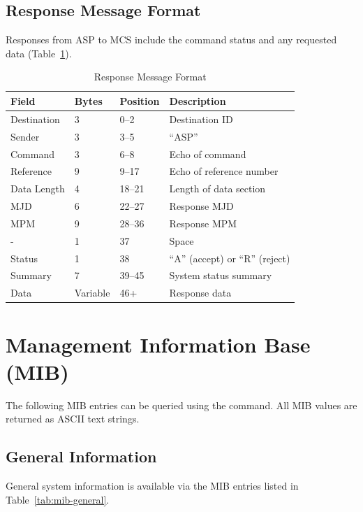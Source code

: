 \subsection{Response Message Format}

Responses from ASP to MCS include the command status and any requested data (Table~\ref{tab:resp-format}).

\begin{table}[htbp]
    \centering
    \caption{Response Message Format}
    \label{tab:resp-format}
    \begin{tabular}{llll}
        \toprule
        \textbf{Field} & \textbf{Bytes} & \textbf{Position} & \textbf{Description} \\
        \midrule
        Destination & 3 & 0--2 & Destination ID \\
        Sender & 3 & 3--5 & ``ASP'' \\
        Command & 3 & 6--8 & Echo of command \\
        Reference & 9 & 9--17 & Echo of reference number \\
        Data Length & 4 & 18--21 & Length of data section \\
        MJD & 6 & 22--27 & Response MJD \\
        MPM & 9 & 28--36 & Response MPM \\
        - & 1 & 37 & Space \\
        Status & 1 & 38 & ``A'' (accept) or ``R'' (reject) \\
        Summary & 7 & 39--45 & System status summary \\
        Data & Variable & 46+ & Response data \\
        \bottomrule
    \end{tabular}
\end{table}

\section{Management Information Base (MIB)}
\label{sec:mib}

The following MIB entries can be queried using the  command. All MIB values are returned as ASCII text strings.

\subsection{General Information}

General system information is available via the MIB entries listed in Table~\ref{tab:mib-general}.

